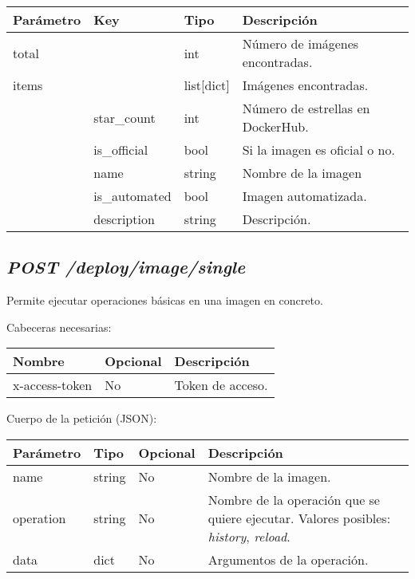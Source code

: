 				\begin{table}[!h]
					\centering
	\begin{adjustbox}{max width=\textwidth}
					\begin{tabular}{|l|l|l|l|}
						\hline
						Parámetro & Key & Tipo & Descripción \\ \hline
						total &  & int & Número de imágenes encontradas. \\ \hline
						items &  & list[dict] & Imágenes encontradas. \\ \hline
						& star\_count & int & Número de estrellas en DockerHub. \\ \hline
						& is\_official & bool & Si la imagen es oficial o no. \\ \hline
						& name & string & Nombre de la imagen \\ \hline
						& is\_automated & bool & Imagen automatizada. \\ \hline
						& description & string & Descripción. \\ \hline
					\end{tabular}
\end{adjustbox}
				\end{table}
		
	
	
	\subsection{\textit{POST /deploy/image/single}}
		Permite ejecutar operaciones básicas en una imagen en concreto.
		
		Cabeceras necesarias:
		\begin{table}[h!]
			\centering
	\begin{adjustbox}{max width=\textwidth}
			\begin{tabular}{|l|l|l|}
				\hline
				Nombre & Opcional & Descripción \\ \hline
				x-access-token & No & Token de acceso. \\ \hline
			\end{tabular}
\end{adjustbox}
		\end{table}
		
		Cuerpo de la petición (JSON):
		
		\begin{table}[!h]
			\centering
	\begin{adjustbox}{max width=\textwidth}
			\begin{tabular}{|l|l|l|l|}
				\hline
				Parámetro & Tipo & Opcional & Descripción \\ \hline
				name & string & No & Nombre de la imagen. \\ \hline
				operation & string & No & Nombre de la operación que se quiere ejecutar. Valores posibles: \textit{history}, \textit{reload}. \\ \hline
				data & dict & No & Argumentos de la operación. \\ \hline
			\end{tabular}
\end{adjustbox}
		\end{table}
	
